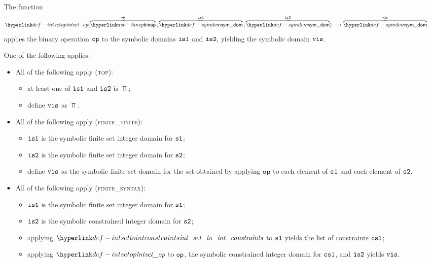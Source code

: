 \begin{mathpar}
\end{mathpar}

\hypertarget{def-intsetop}{}
The function
\[
\intsetop(\overname{\binop}{\op} \aslsep \overname{\symdom}{\visone} \aslsep \overname{\symdom}{\vistwo})
\aslto \overname{\symdom}{\vis}
\]
applies the binary operation $\op$ to the symbolic domains $\visone$ and $\vistwo$,
yielding the symbolic domain $\vis$.

\ProseParagraph
One of the following applies:
\begin{itemize}
  \item All of the following apply (\textsc{top}):
  \begin{itemize}
    \item at least one of $\visone$ and $\vistwo$ is $\Top$;
    \item define $\vis$ as $\Top$.
  \end{itemize}

  \item All of the following apply (\textsc{finite\_finite}):
  \begin{itemize}
    \item $\visone$ is the symbolic finite set integer domain for $\vsone$;
    \item $\vistwo$ is the symbolic finite set integer domain for $\vstwo$;
    \item define $\vis$ as the symbolic finite set domain for the set obtained
          by applying $\op$ to each element of $\vsone$ and each element of $\vstwo$.
  \end{itemize}

  \item All of the following apply (\textsc{finite\_syntax}):
  \begin{itemize}
    \item $\visone$ is the symbolic finite set integer domain for $\vsone$;
    \item $\vistwo$ is the symbolic constrained integer domain for $\vstwo$;
    \item applying $\intsettointconstraints$ to $\vsone$ yields the list of constraints $\csone$;
    \item applying $\intsetop$ to $\op$, the symbolic constrained integer domain for $\csone$,
          and $\vistwo$ yields $\vis$.
  \end{itemize}


\end{itemize}
